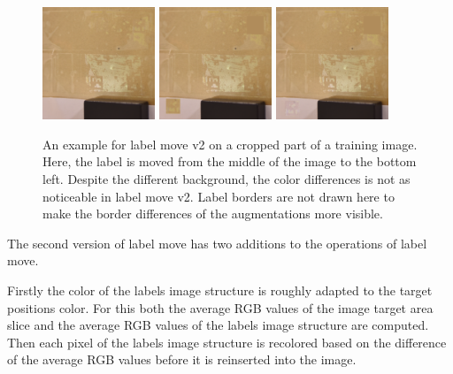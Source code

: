\documentclass[10pt]{book}
\begin{document}
\begin{figure}
  \centering
     {\includegraphics[width=0.3\textwidth]{image/aug_lm2_before}}
     {\includegraphics[width=0.3\textwidth]{image/aug_lm2_after_old}}
     {\includegraphics[width=0.3\textwidth]{image/aug_lm2_after}}
  \caption{An example for label move v2 on a cropped part of a training image. Here, the label is moved from the middle of the image to the bottom left. Despite the different background, the color differences is not as noticeable in label move v2. Label borders are not drawn here to make the border differences of the augmentations more visible.}
  \label{fig:aug_lm2_example}
\end{figure}

The second version of label move has two additions to the operations of label move. 

Firstly the color of the labels image structure is roughly adapted to the target positions color. For this both the average RGB values of the image target area slice and the average RGB values of the labels image structure are computed. Then each pixel of the labels image structure is recolored based on the difference of the average RGB values before it is reinserted into the image.
\end{document}
